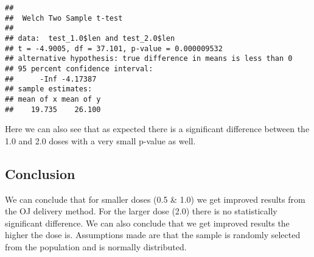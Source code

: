 \documentclass[
]{article}
\begin{document}
\begin{verbatim}
## 
##  Welch Two Sample t-test
## 
## data:  test_1.0$len and test_2.0$len
## t = -4.9005, df = 37.101, p-value = 0.000009532
## alternative hypothesis: true difference in means is less than 0
## 95 percent confidence interval:
##      -Inf -4.17387
## sample estimates:
## mean of x mean of y 
##    19.735    26.100
\end{verbatim}

Here we can also see that as expected there is a significant difference
between the 1.0 and 2.0 doses with a very small p-value as well.

\hypertarget{conclusion}{%
\subsection{Conclusion}\label{conclusion}}

We can conclude that for smaller doses (0.5 \& 1.0) we get improved
results from the OJ delivery method. For the larger dose (2.0) there is
no statistically significant difference. We can also conclude that we
get improved results the higher the dose is. Assumptions made are that
the sample is randomly selected from the population and is normally
distributed.
\end{document}
